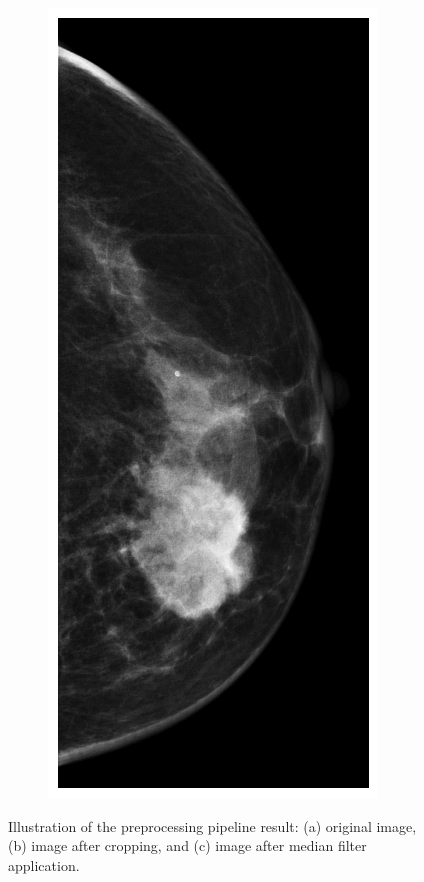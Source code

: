 \documentclass[a4paper,10pt]{book}
\begin{document}
\begin{figure}[h!]
\begin{subfigure}[t]{0.15\textwidth}
        \caption{}
        \label{fig:pre_cropped}
    \end{subfigure}
    \begin{subfigure}[t]{0.15\textwidth}
        \centering
        \includegraphics[width=\textwidth]{reports//assets/preprocess_c.png}
        \caption{}
        \label{fig:pre_mean}
    \end{subfigure}
   \caption[Preprocessing pipeline result]{Illustration of the preprocessing pipeline result: (a) original image, (b) image after cropping, and (c) image after median filter application.}
    \label{fig:preprocessing}
\end{figure}
\end{document}
